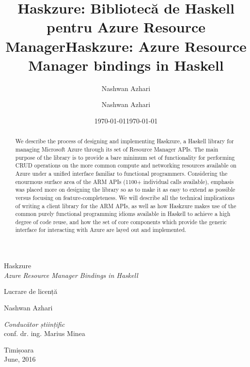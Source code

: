 \documentclass[11pt]{report}
\begin{document}
\begin{titlepage}
\begin{center}
    \vspace*{80px}

    {\Huge Haskzure}\\[4mm]
    {\Large \textit{Azure Resource Manager Bindings in Haskell}}\\

    \vspace{10mm}

    {\textsc Lucrare de licență} \\[3cm]

    \begin{flushright}
        \large Nashwan Azhari \\[1cm]
    \end{flushright}
    \begin{flushleft}
        \large
            \emph{Conducător științific} \\
            conf. dr. ing. Marius Minea \\[1cm]
    \end{flushleft}

    \vfill
    {\large {Timișoara \\June, 2016}}

\end{center}
\end{titlepage}

\date{\today{}}
\title{Haskzure: Bibliotecă de Haskell pentru Azure Resource Manager}
\author{Nashwan Azhari}
\maketitle

\date{\today{}}
\title{Haskzure: Azure Resource Manager bindings in Haskell}
\author{Nashwan Azhari}
\maketitle

\begin{abstract}

We describe the process of designing and implementing Haskzure, a Haskell
library for managing Microsoft Azure through its set of Resource Manager APIs. The
main purpose of the library is to provide a bare minimum set of functionality
for performing CRUD operations on the more common compute and networking
resources available on Azure under a unified interface familiar to functional
programmers.
Considering the enourmous surface area of the ARM APIs (1100+ individual calls
available), emphasis was placed more on designing the library so as to make it
as easy to extend as possible versus focusing on feature-completeness. \newline
We will describe all the technical implications of writing a client library for
the ARM APIs, as well as  how Haskzure makes use of the common purely
functional programming idioms available in Haskell to achieve a high degree of
code reuse, and how the set of core components which provide the generic
interface for interacting with Azure are layed out and implemented.

\end{abstract}
\end{document}
